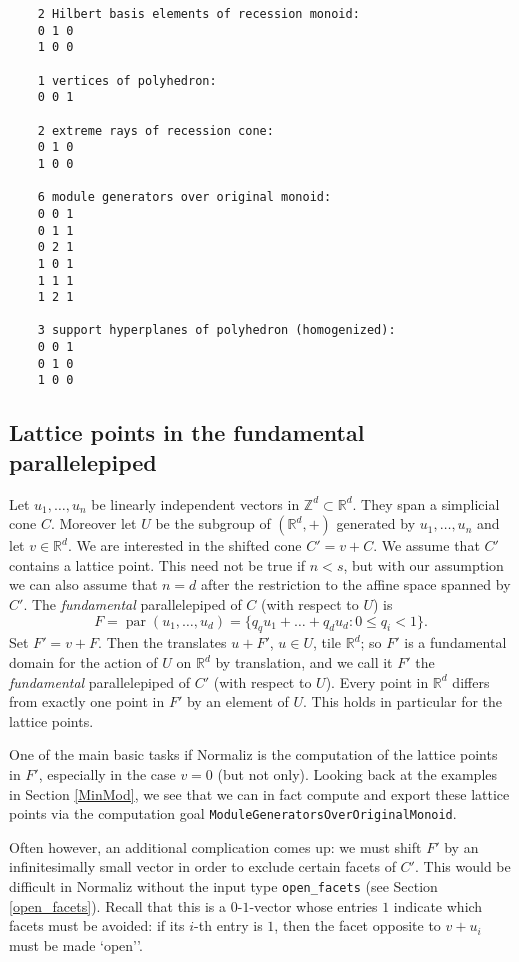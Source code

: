 \documentclass[12pt,a4paper]{scrartcl}
\theoremstyle{definition}
\def\ZZ{{\mathbb Z}}
\def\RR{{\mathbb R}}
\DeclareMathOperator{\para}{par}
\begin{document}
{\begin{Verbatim}
	2 Hilbert basis elements of recession monoid:
	0 1 0
	1 0 0
	
	1 vertices of polyhedron:
	0 0 1
	
	2 extreme rays of recession cone:
	0 1 0
	1 0 0
	
	6 module generators over original monoid:
	0 0 1
	0 1 1
	0 2 1
	1 0 1
	1 1 1
	1 2 1
	
	3 support hyperplanes of polyhedron (homogenized):
	0 0 1
	0 1 0
	1 0 0
	\end{Verbatim}
	
	\subsection{Lattice points in the fundamental parallelepiped}\label{LattPointsFPE}
	
	Let $u_1,\dots,u_n$ be linearly independent vectors in $\ZZ^d\subset\RR^d$. They span a simplicial cone $C$. Moreover let $U$ be the subgroup of $(\RR^d,+)$ generated by $u_1,\dots,u_n$ and let $v\in\RR^d$. We are interested in the shifted cone $C'=v+C$. We assume that $C'$ contains a lattice point. This need not be true if $n<s$, but with our assumption we can also assume that $n=d$ after the restriction to the affine space spanned by $C'$. The \emph{fundamental} parallelepiped of $C$ (with respect to $U$) is
	$$
	F=\para(u_1,\dots,u_d)=\{q_qu_1+\dots+q_du_d: 0\le q_i<1  \}.
	$$
	Set $F'=v+F$. Then the translates $u+F'$, $u\in U$, tile $\RR^d$; so $F'$ is a fundamental domain for the action of $U$ on $\RR^d$ by translation, and we call it $F'$ the \emph{fundamental} parallelepiped of $C'$  (with respect to $U$). Every point in $\RR^d$ differs from exactly one point in $F'$ by an element of $U$. This holds in particular for the lattice points.
	
	One of the main basic tasks if Normaliz is the computation of the lattice points in $F'$, especially in the case $v=0$ (but not only). Looking back at the examples in Section \ref{MinMod}, we see that we can in fact compute and export these lattice points via the computation goal \verb|ModuleGeneratorsOverOriginalMonoid|. 
	
	Often however, an additional complication comes up: we  must shift $F'$ by an infinitesimally small vector in order to exclude certain facets of $C'$. This would be difficult in Normaliz without the input type \verb|open_facets| (see Section \ref{open_facets}). Recall that this is a $0$-$1$-vector whose entries $1$ indicate which facets must be avoided: if its $i$-th entry is $1$, then the facet opposite to $v+u_i$ must be made `open''.
	
}
\end{document}
